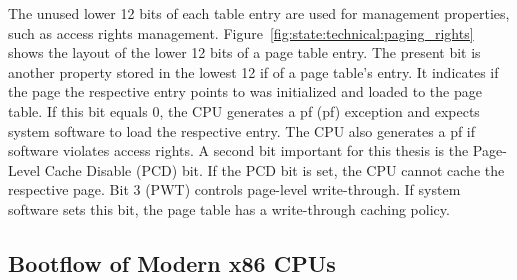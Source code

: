 The unused lower 12 bits of each table entry are used for management properties,
such as access rights management. Figure~\ref{fig:state:technical:paging_rights}
shows the layout of the lower 12 bits of a page table entry. The present bit is
another property stored in the lowest 12 if of a page table's entry. It
indicates if the page the respective entry points to was initialized and loaded
to the page table. If this bit equals 0, the CPU generates a \gls{pf}
(\gls{pf}) exception and expects system software to load the respective
entry. The CPU also generates a \gls{pf} if software violates access
rights. A second bit important for this thesis is the Page-Level Cache Disable
(PCD) bit. If the PCD bit is set, the CPU cannot cache the respective page. Bit
3 (PWT) controls page-level write-through. If system software sets this bit, the
page table has a write-through caching policy.

\subsection{Bootflow of Modern x86 CPUs}
\label{sec:state:technical:boot}
